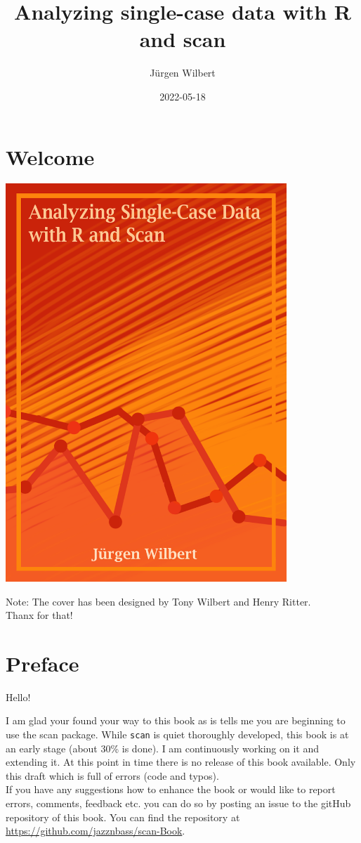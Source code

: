 \documentclass[
]{book}
\title{Analyzing single-case data with R and scan}
\author{Jürgen Wilbert}
\date{2022-05-18}
\begin{document}
\maketitle

{
\setcounter{tocdepth}{1}
\tableofcontents
}
\hypertarget{welcome}{%
\chapter*{Welcome}\label{welcome}}

\includegraphics[width=4.16667in,height=\textheight]{images/cover.png}

Note: The cover has been designed by Tony Wilbert and Henry Ritter.\\
Thanx for that!

\hypertarget{preface}{%
\chapter*{Preface}\label{preface}}

Hello!

I am glad your found your way to this book as is tells me you are beginning to use the scan package. While \texttt{scan} is quiet thoroughly developed, this book is at an early stage (about 30\% is done). I am continuously working on it and extending it. At this point in time there is no release of this book available. Only this draft which is full of errors (code and typos).\\
If you have any suggestions how to enhance the book or would like to report errors, comments, feedback etc. you can do so by posting an issue to the gitHub repository of this book. You can find the repository at \url{https://github.com/jazznbass/scan-Book}.
\end{document}
